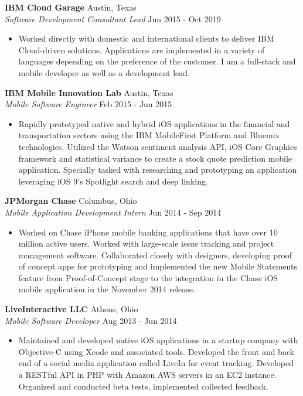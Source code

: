 \documentclass[a4paper]{article}
\begin{document}
\textbf{IBM Cloud Garage} \hfill Austin, Texas\\
\textit{Software Development Consultant Lead} \hfill Jun 2015 - Oct 2019\\
\vspace{-1mm}
\begin{itemize} \itemsep 1pt
	\item Worked directly with domestic and international clients to deliver IBM Cloud-driven solutions. Applications are implemented in a variety of languages depending on the preference of the customer. I am a full-stack and mobile developer as well as a development lead.
\end{itemize}
\textbf{IBM Mobile Innovation Lab} \hfill Austin, Texas\\
\textit{Mobile Software Engineer} \hfill Feb 2015 - Jun 2015\\
\vspace{-1mm}
\begin{itemize} \itemsep 1pt
	\item Rapidly prototyped native and hybrid iOS applications in the financial and transportation sectors using the IBM MobileFirst Platform and Bluemix technologies. Utilized the Watson sentiment analysis API, iOS Core Graphics framework and statistical variance to create a stock quote prediction mobile application. Specially tasked with researching and prototyping an application leveraging iOS 9’s Spotlight search and deep linking.
\end{itemize}
\textbf{JPMorgan Chase} \hfill Columbus, Ohio\\
\textit{Mobile Application Development Intern} \hfill Jun 2014 - Sep 2014\\
\vspace{-1mm}
\begin{itemize} \itemsep 1pt
	\item Worked on Chase iPhone mobile banking applications that have over 10 million active users. Worked with large-scale issue tracking and project management software. Collaborated closely with designers, developing proof of concept apps for prototyping and implemented the new Mobile Statements feature from Proof-of-Concept stage to the integration in the Chase iOS mobile application in the November 2014 release.
\end{itemize}
\textbf{LiveInteractive LLC} \hfill Athens, Ohio\\
\textit{Mobile Software Developer} \hfill Aug 2013 - Jun 2014\\
\vspace{-1mm}
\begin{itemize} \itemsep 1pt
	\item Maintained and developed native iOS applications in a startup company with Objective-C using Xcode and associated tools. Developed the front and back end of a social media application called LiveIn for event tracking. Developed a RESTful API in PHP with Amazon AWS servers in an EC2 instance. Organized and conducted beta tests, implemented collected feedback.
\end{itemize}
\end{document}
